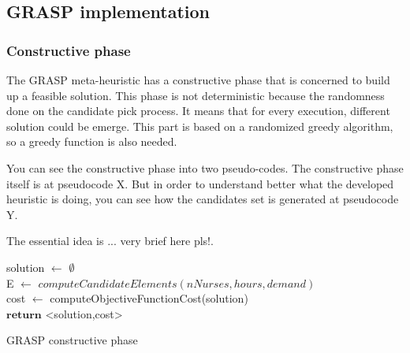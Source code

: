 \subsection{GRASP implementation}

\subsubsection{Constructive phase}

The GRASP meta-heuristic has a constructive phase that is concerned to build up a feasible solution. This phase is not deterministic because the randomness done on the candidate pick process. It means
that for every execution, different solution could be emerge. This part is based on a randomized greedy algorithm, so a greedy function is also needed.

You can see the constructive phase into two pseudo-codes. The constructive phase itself is at pseudocode X. But in order to understand better what the developed heuristic is doing, you can
see how the candidates set is generated at pseudocode Y.

The essential idea is ... very brief here pls!.

\makeatletter 
{} 
\makeatother

\begin{algorithm}[H]


solution $\leftarrow$ $\emptyset$ \\
E $\leftarrow$ $computeCandidateElements(nNurses, hours, demand)$ \\
cost $\leftarrow$ computeObjectiveFunctionCost(solution)\\
$\textbf{return}$ <solution,cost>
\caption{GRASP constructive phase}\label{alg.mainLoop}
\end{algorithm}

